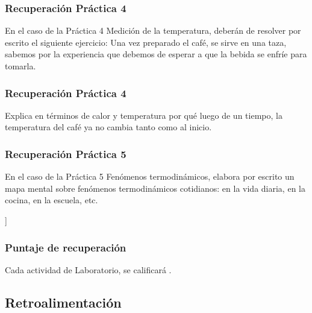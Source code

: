 \documentclass[14pt]{beamer}
\begin{document}
\begin{frame}
\frametitle{Recuperación Práctica 4}
En el caso de la Práctica 4 Medición de la temperatura, \pause deberán de resolver por escrito el siguiente ejercicio: Una vez preparado el café, se sirve en una taza, sabemos por la experiencia que debemos de esperar a que la bebida se enfríe para tomarla.
\end{frame}
\begin{frame}
\frametitle{Recuperación Práctica 4}
Explica en términos de calor y temperatura por qué luego de un tiempo, la temperatura del café ya no cambia tanto como al inicio.
\end{frame}
\begin{frame}
\frametitle{Recuperación Práctica 5}
En el caso de la Práctica 5 Fenómenos termodinámicos, \pause elabora por escrito un mapa mental sobre fenómenos termodinámicos cotidianos: en la vida diaria, en la cocina, en la escuela, etc.
\end{frame}
\begin{frame}]
\frametitle{Puntaje de recuperación}
Cada actividad de Laboratorio, se calificará .
\end{frame}

\subsection{Retroalimentación}
\end{document}
